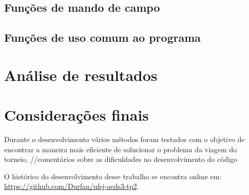 \documentclass[12pt,a4paper]{article}
\begin{document}
\subsection{Funções de mando de campo}

\subsection{Funções de uso comum ao programa}

\section{Análise de resultados}

\section{Considerações finais}

Durante o desenvolvimento vários métodos foram testados com o objetivo de encontrar a maneira mais eficiente de solucionar o problema da viagem do torneio.
//comentários sobre as dificuldades no desenvolvimento do código

\pagebreak

\begin{flushleft}
	\nocite{*}
	
	\vfill
	O histórico do desenvolvimento desse trabalho se encontra online em:\\ \url{https://github.com/Durfan/ufsj-aeds3-tp2}.
\end{flushleft}
\end{document}
